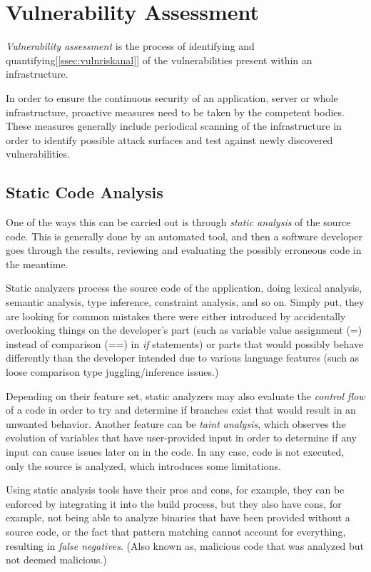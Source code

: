\documentclass[a4paper,12pt]{article}
\begin{document}
\newpage
\section{Vulnerability Assessment}
	
	\textit{Vulnerability assessment} is the process of identifying and quantifying[\ref{ssec:vulnriskanal}] of the vulnerabilities present within an infrastructure.
	
	In order to ensure the continuous security of an application, server or whole infrastructure, proactive measures need to be taken by the competent bodies. These measures generally include periodical scanning of the infrastructure in order to identify possible attack surfaces and test against newly discovered vulnerabilities.
	
\subsection{Static Code Analysis}
	
	One of the ways this can be carried out is through \textit{static analysis} of the source code. This is generally done by an automated tool, and then a software developer goes through the results, reviewing and evaluating the possibly erroneous code in the meantime.
	
	Static analyzers process the source code of the application, doing lexical analysis, semantic analysis, type inference, constraint analysis, and so on. Simply put, they are looking for common mistakes there were either introduced by accidentally overlooking things on the developer's part (such as variable value assignment (=) instead of comparison (==) in \textit{if} statements) or parts that would possibly behave differently than the developer intended due to various language features (such as loose comparison type juggling/inference issues.)
	
	Depending on their feature set, static analyzers may also evaluate the \textit{control flow} of a code in order to try and determine if branches exist that would result in an unwanted behavior. Another feature can be \textit{taint analysis}, which observes the evolution of variables that have user-provided input in order to determine if any input can cause issues later on in the code. In any case, code is not executed, only the source is analyzed, which introduces some limitations.
	
	Using static analysis tools have their pros and cons, for example, they can be enforced by integrating it into the build process, but they also have cons, for example, not being able to analyze binaries that have been provided without a source code, or the fact that pattern matching cannot account for everything, resulting in \textit{false negatives}. (Also known as, malicious code that was analyzed but not deemed malicious.)
	
\end{document}
